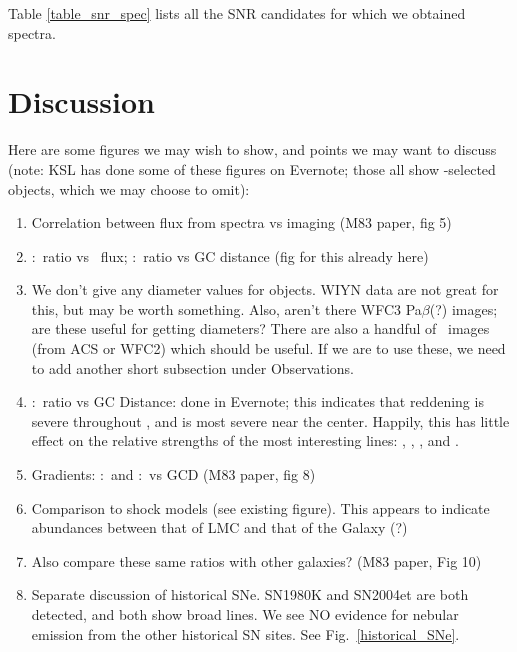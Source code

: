 
Table \ref{table_snr_spec}  lists all the SNR candidates for which we obtained spectra.   


\section{Discussion}
Here are some figures we may wish to show, and points we may want to discuss (note: KSL has done some of these figures on Evernote; those all show \oiii-selected objects, which we may choose to omit):
\begin{enumerate}
    \item Correlation between flux from spectra vs imaging (M83 paper, fig 5)
    \item \sii:\ha\ ratio vs \ha\ flux; \sii:\ha\ ratio vs GC distance (fig for this already here)
    \item We don't give any diameter values for objects.  WIYN data are not great for this, but may be worth something.  Also, aren't there WFC3 Pa$\beta$(?) images; are these useful for getting diameters? There are also a handful of \ha\ images (from ACS or WFC2) which should be useful.  If we are to use these, we need to add another short subsection under Observations.
    \item \hb:\ha\ ratio vs GC Distance: done in Evernote; this indicates that reddening is severe throughout \gal, and is most severe near the center.  Happily, this has little effect on the relative strengths of the most interesting lines: \oi, \ha, \nii, and \sii.
    \item Gradients: \nii:\ha\ and \sii:\ha\ vs GCD (M83 paper, fig 8)
    \item Comparison to shock models (see existing figure).  This appears to indicate abundances between that of LMC and that of the Galaxy (?)
    \item Also compare these same ratios with other galaxies? (M83 paper, Fig 10)
    \item Separate discussion of historical SNe.  SN1980K and SN2004et are both detected, and both show broad lines.  We see NO evidence for nebular  emission from the other historical SN sites.  See Fig.~\ref{historical_SNe}.
\end{enumerate}


